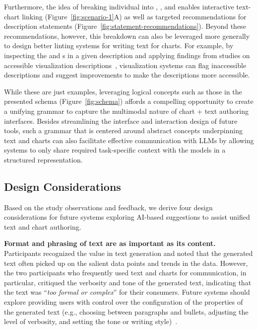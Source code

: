 Furthermore, the idea of breaking individual  into , , and  enables interactive text-chart linking (Figure~\ref{fig:scenario-1}A) as well as targeted recommendations for description statements (Figure~\ref{fig:statement-recommendations}).
Beyond these recommendations, however, this breakdown can also be leveraged more generally to design better linting systems for writing text for charts.
For example, by inspecting the  and s in a given description and applying findings from studies on accessible visualization descriptions~\cite{yaneva2015accessible,lundgard2021accessible,jung2021communicating,kim2023explain}, visualization systems can flag inaccessible descriptions and suggest improvements to make the descriptions more accessible.

While these are just examples, leveraging logical concepts such as those in the presented schema (Figure~\ref{fig:schema}) affords a compelling opportunity to create a unifying grammar to capture the multimodal nature of chart + text authoring interfaces.
Besides streamlining the interface and interaction design of future tools, such a grammar that is centered around abstract concepts underpinning text and charts can also facilitate effective communication with LLMs by allowing systems to only share required task-specific context with the models in a structured representation.

\subsection{Design Considerations}

Based on the study observations and feedback, we derive four design considerations for future systems exploring AI-based suggestions to assist unified text and chart authoring.

\vspace{.5em}
\noindent\textbf{Format and phrasing of text are as important as its content.}
Participants recognized the value in text generation and noted that the generated text often picked up on the salient data points and trends in the data. However, the two participants who frequently used text and charts for communication, in particular, critiqued the verbosity and tone of the generated text, indicating that the text was ``\textit{too formal or complex}'' for their consumers. Future systems should explore providing users with control over the configuration of the properties of the generated text (e.g., choosing between paragraphs and bullets, adjusting the level of verbosity, and setting the tone or writing style)~\cite{louis2014}.


